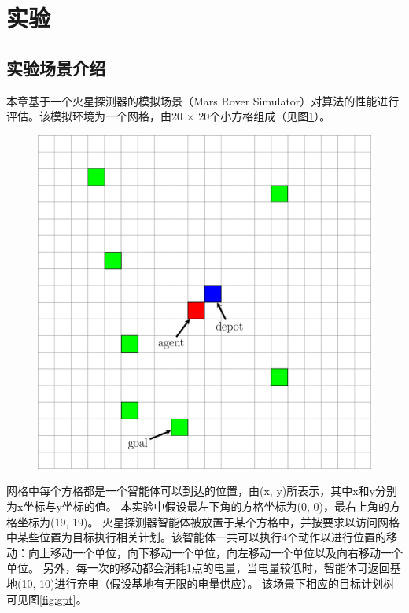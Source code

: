 \section{实验}
\subsection{实验场景介绍}
本章基于一个火星探测器的模拟场景（Mars Rover Simulator）对\SAM 算法的性能进行评估。该模拟环境为一个网格，由20 $\times$ 20个小方格组成（见图\ref{fig:marsrover}）。
\begin{figure}[h!]
\centering
\includegraphics[scale=0.4]{./figs/mg_example}
\captionsetup{justification=centering}
\label{fig:marsrover}
\end{figure}

网格中每个方格都是一个智能体可以到达的位置，由(x, y)所表示，其中x和y分别为x坐标与y坐标的值。
%
本实验中假设最左下角的方格坐标为(0, 0)，最右上角的方格坐标为(19, 19)。
% 
火星探测器智能体被放置于某个方格中，并按要求以访问网格中某些位置为目标执行相关计划。该智能体一共可以执行4个动作以进行位置的移动：向上移动一个单位，向下移动一个单位，向左移动一个单位以及向右移动一个单位。
% 
另外，每一次的移动都会消耗1点的电量，当电量较低时，智能体可返回基地(10, 10)进行充电（假设基地有无限的电量供应）。
%
该场景下相应的目标计划树可见图\ref{fig:gpt}。
